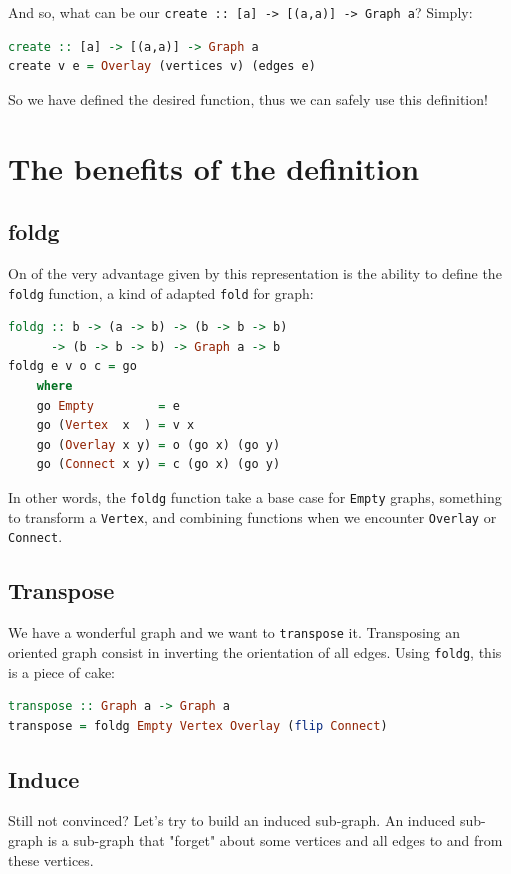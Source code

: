 \documentclass[10pt,a4paper]{article}
\begin{document}
And so, what can be our \verb|create :: [a] -> [(a,a)] -> Graph a|? Simply:
\begin{lstlisting}[language=Haskell, frame=single]
create :: [a] -> [(a,a)] -> Graph a
create v e = Overlay (vertices v) (edges e)
\end{lstlisting}

So we have defined the desired function, thus we can safely use this definition!

\section{The benefits of the definition}
\subsection{foldg}
On of the very advantage given by this representation is the ability to define the \verb|foldg| function, a kind of adapted \verb|fold| for graph:
\begin{lstlisting}[language=Haskell, frame=single]
foldg :: b -> (a -> b) -> (b -> b -> b)
      -> (b -> b -> b) -> Graph a -> b
foldg e v o c = go
	where
	go Empty         = e
	go (Vertex  x  ) = v x
	go (Overlay x y) = o (go x) (go y)
	go (Connect x y) = c (go x) (go y)
\end{lstlisting}
In other words, the \verb|foldg| function take a base case for \verb|Empty| graphs, something to transform a \verb|Vertex|, and combining functions when we encounter \verb|Overlay| or \verb|Connect|.

\subsection{Transpose}

We have a wonderful graph and we want to \verb|transpose| it. Transposing an oriented graph consist in inverting the orientation of all edges. Using \verb|foldg|, this is a piece of cake:

\begin{lstlisting}[language=Haskell, frame=single]
transpose :: Graph a -> Graph a
transpose = foldg Empty Vertex Overlay (flip Connect)
\end{lstlisting}

\subsection{Induce}

Still not convinced? Let's try to build an induced sub-graph. An induced sub-graph is a sub-graph that "forget" about some vertices and all edges to and from these vertices.
\end{document}
